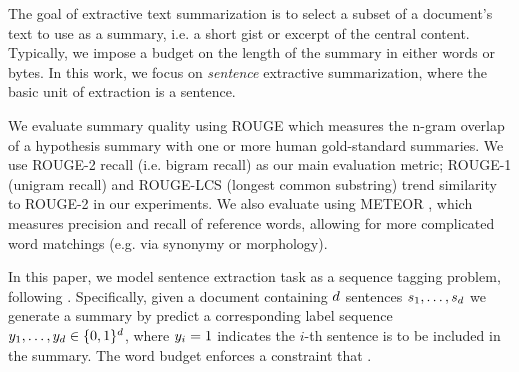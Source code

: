 %

The goal of extractive text summarization is to select a subset of a document's
text to use as a summary, i.e. a short gist or excerpt of the central content.
Typically, we impose a budget on the length of the summary in either 
words or bytes. In this work, we focus on \textit{sentence} extractive 
summarization, 
where the basic unit of extraction is a sentence.

We evaluate summary quality using ROUGE \cite{lin2004rouge} 
which measures the n-gram
overlap of a hypothesis summary with one or more human gold-standard summaries.
We use ROUGE-2 recall (i.e. bigram recall) as our main evaluation metric;
ROUGE-1 (unigram recall) and ROUGE-LCS (longest common substring) trend similarity to ROUGE-2 in our experiments.
We also evaluate using METEOR \cite{denkowski:lavie:meteor-wmt:2014},
which measures precision and recall of reference words, allowing for
more complicated word matchings (e.g. via synonymy or morphology).

In this paper, we model sentence extraction task as a sequence tagging problem, following \cite{} .
Specifically, given a document containing $d$ sentences $\sent_1, \ldots, 
\sent_{\docsize}$ we generate a summary by predict a corresponding label sequence $\slabel_1,
\ldots, \slabel_{\docsize} \in \{0, 1\}^{\docsize}$, where $\slabel_i = 1$ 
indicates the $i$-th sentence is to be included in the summary.
The word budget enforces a constraint that .

